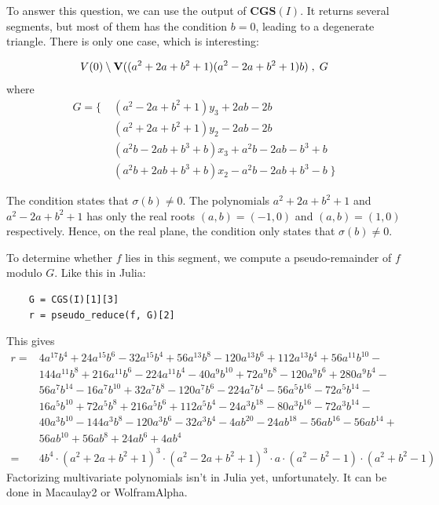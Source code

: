 \begin{example}
  To answer this question, we can use the output of $\mathbf{CGS}(I)$. It returns several segments, but most of them has the condition $b = 0$, leading to a degenerate triangle. There is only one case, which is interesting:

  \[V(0) \setminus \operatorname{\mathbf V}((a^{2} + 2a + b^{2} + 1)(a^{2} - 2a + b^{2} + 1)b)\;, \; G\] where
  \begin{align*}
 G = \{\; &(a^2 - 2a + b^2 + 1)y_3 + 2ab - 2b \\
          &(a^2 + 2a + b^2 + 1)y_2 - 2ab - 2b \\
          &(a^2b - 2ab + b^3 + b)x_3 + a^2b - 2ab - b^3 + b \\
          &(a^2b + 2ab + b^3 + b)x_2 - a^2b - 2ab + b^3 - b \; \}
  \end{align*}

  The condition states that $\sigma(b) \neq 0$. The polynomials $a^{2} + 2a + b^{2} + 1$ and $a^{2} - 2a + b^{2} + 1$ has only the real roots $(a, b) = (-1, 0)$ and $(a, b) = (1, 0)$ respectively. Hence, on the real plane, the condition only states that $\sigma(b) \neq 0$.

  To determine whether $f$ lies in this segment, we compute a pseudo-remainder of $f$ modulo $G$. Like this in Julia:

  \begin{verbatim}
    G = CGS(I)[1][3]
    r = pseudo_reduce(f, G)[2]
  \end{verbatim}
  This gives
  \begin{align*}
    r = &4 a^{17} b^4 + 24 a^{15} b^6 - 32 a^{15} b^4 + 56 a^{13} b^8 - 120 a^{13} b^6 + 112 a^{13} b^4 + 56 a^{11} b^{10} - \\
        &144 a^{11} b^8 + 216 a^{11} b^6 - 224 a^{11} b^4 - 40 a^9 b^{10} + 72 a^9 b^8 - 120 a^9 b^6 + 280 a^9 b^4 - \\
        &56 a^7 b^{14} - 16 a^7 b^{10} + 32 a^7 b^8 - 120 a^7 b^6 - 224 a^7 b^4 - 56 a^5 b^{16} - 72 a^5 b^{14} - \\
        &16 a^5 b^{10} + 72 a^5 b^8 + 216 a^5 b^6 + 112 a^5 b^4 - 24 a^3 b^{18} - 80 a^3 b^{16} - 72 a^3 b^{14} - \\
        &40 a^3 b^{10} - 144 a^3 b^8 - 120 a^3 b^6 - 32 a^3 b^4 - 4 a b^{20} - 24 a b^{18} - 56 a b^{16} - 56 a b^{14} + \\
        &56 a b^{10} + 56 a b^8 + 24 a b^6 + 4 a b^4 \\
    = &4 b^{4}\cdot (a^{2} + 2a + b^{2} + 1)^{3} \cdot (a^{2} - 2a + b^{2} + 1)^{3} \cdot a \cdot (a^{2} - b^{2} - 1) \cdot (a^{2} + b^{2} - 1)
  \end{align*}
  Factorizing multivariate polynomials isn't in Julia yet, unfortunately. It can be done in Macaulay2 or WolframAlpha.


\end{example}
